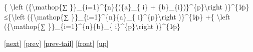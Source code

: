 \documentclass[]{article}
\begin{document}
\{ \textbackslash{}left (\{\textbackslash{}mathop\{∑
\}\}\_\{i=1\}\^{}\{n\}\{(\{a\}\_\{ i\} +
\{b\}\_\{i\})\}\^{}\{p\}\textbackslash{}right )\}\^{}\{1∕p\}
≤\{\textbackslash{}left (\{\textbackslash{}mathop\{∑
\}\}\_\{i=1\}\^{}\{n\}\{a\}\_\{ i\}\^{}\{p\}\textbackslash{}right
)\}\^{}\{1∕p\} +\{ \textbackslash{}left (\{\textbackslash{}mathop\{∑
\}\}\_\{i=1\}\^{}\{n\}\{b\}\_\{ i\}\^{}\{p\}\textbackslash{}right
)\}\^{}\{1∕p\}

{[}\href{coursse47.html}{next}{]} {[}\href{coursse45.html}{prev}{]}
{[}\href{coursse45.html\#tailcoursse45.html}{prev-tail}{]}
{[}\href{coursse46.html}{front}{]}
{[}\href{coursch9.html\#coursse46.html}{up}{]}
\end{document}
